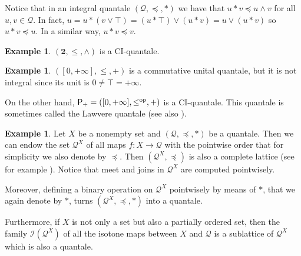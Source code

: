 \documentclass[11pt,a4paper]{amsart}
\theoremstyle{definition}
\newtheorem{example}[theorem]{Example}
\begin{document}
	
	
	Notice that in an integral quantale $(\mathscr{Q},\preceq,\ast)$ we have that $u\ast v\preceq u\wedge v$ for all $u,v\in \mathscr{Q}.$ In fact, $u=u\ast (v\vee \top)=(u\ast \top)\vee (u\ast v)=u\vee (u\ast v)$ so $u\ast v\preceq u.$ In a similar way, $u\ast v\preceq v.$
	
	\begin{example}
		$(\mathbf{2},\leq,\wedge)$ is a CI-quantale.
	\end{example}
	
	\begin{example}\label{ex: suma reales}
		$([0,+\infty],\leq,+)$ is a commutative unital quantale, but it is not integral since its unit is $0\neq\top=+\infty.$
		
		On the other hand, $\mathsf{P}_+=([0,+\infty],\leq^\text{\normalfont op},+)$ is a CI-quantale. This quantale is sometimes called the Lawvere quantale \cite{CookWeiss22} (see also \cite[Example II.1.10.1.(3)]{BookMonoidalTopology}).
	\end{example}
	
	
	\begin{example}
		Let $X$ be a nonempty set and $(\mathscr{Q},\preceq,\ast)$ be a quantale. Then we can endow the set $\mathscr{Q}^X$ of all maps $f:X\to\mathscr{Q}$ with the pointwise order that for simplicity we also denote by $\preceq.$  Then $(\mathscr{Q}^X,\preceq)$ is also a complete lattice (see for example \cite[Example 2.1.9]{BookQuantales}). Notice that meet and joins in $\mathscr{Q}^X$ are computed pointwisely.
		
		Moreover, defining a binary operation on $\mathscr{Q}^X$ pointwisely by means of $\ast$, that we again denote by $\ast$, turns $(\mathscr{Q}^X,\preceq,\ast)$ into a quantale.
		
		Furthermore, if $X$ is not only a set but also a partially ordered set, then the family $\mathcal{I}(\mathscr{Q}^X)$  of all the isotone maps between $X$ and $\mathscr{Q}$ is a sublattice of $\mathscr{Q}^X$ which is also a quantale.
		
	\end{example}
	
\end{document}
